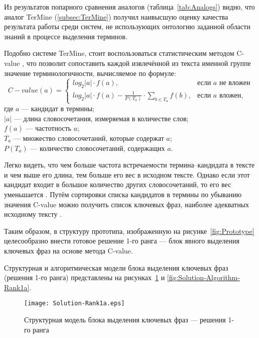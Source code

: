 Из результатов попарного сравнения аналогов
(таблица~\ref{tab:Analogs}) видно, что аналог TerMine
(\ref{subsec:TerMine}) получил наивысшую оценку качества результата
работы среди систем, не использующих онтологию заданной области
знаний в процессе выделения терминов.

Подобно системе TerMine, стоит воспользоваться статистическим методом
C-value \cite{Frantzi00}, что позволит сопоставить каждой извлечённой из
текста именной группе значение терминологичности, вычисляемое по формуле:
\begin{equation}
  C-value(a) = \begin{cases}
    log_{2}|a| \cdot f(a), &
                 \mbox{если } a \mbox{ не вложен} \\
    log_{2}|a| \cdot f(a) - \frac{1}{P(T_{a})}
               \cdot \sum_{b \in T_{a}} f(b), &
                 \mbox{если } a \mbox{ вложен},
  \end{cases}
  \label{eq:CValue}
\end{equation}
где $a$ — кандидат в термины; \\
$|a|$ — длина словосочетания, измеряемая в количестве слов; \\
$f(a)$ — частотность $a$; \\
$T_{a}$ — множество словосочетаний, которые содержат $a$; \\
$P(T_{a})$ — количество словосочетаний, содержащих $a$.

Легко видеть, что чем больше частота встречаемости термина--кандидата
в тексте и чем выше его длина, тем больше его вес в исходном тексте.
Однако если этот кандидат входит в большое количество других
словосочетаний, то его вес уменьшается \cite{Frantzi00}. Путём
сортировки списка кандидатов в термины по убыванию значения C-value
можно получить список ключевых фраз, наиболее адекватных исходному
тексту \cite{Braslavsky08}.

Таким образом, в структуру прототипа, изображенную на
рисунке~\ref{fig:Prototype} целесообразно внести готовое решение
1-го ранга — блок явного выделения ключевых фраз на основе
метода C-value.

Структурная и алгоритмическая модели блока выделения ключевых
фраз (решения 1-го ранга) представлены на
рисунках~\ref{fig:Solution-Rank1a} и
\ref{fig:Solution-Algorithm-Rank1a}.

\begin{figure}[ht]
  \centering
  \texttt{[image: Solution-Rank1a.eps]}
  \caption{Структурная модель блока выделения ключевых фраз —
решения 1-го ранга}
  \label{fig:Solution-Rank1a}
\end{figure}

